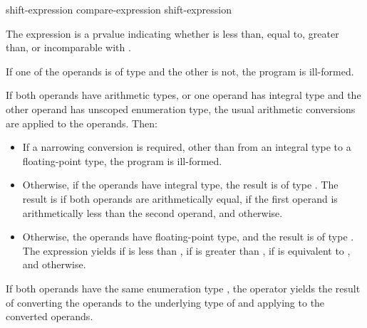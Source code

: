 %
%
%

\begin{bnf}
\br
    shift-expression\br
    compare-expression \terminal{<=>} shift-expression
\end{bnf}

\pnum
The expression  is a prvalue indicating whether
 is less than, equal to, greater than, or incomparable with
.

\pnum
If one of the operands is of type 
and the other is not, the program is ill-formed.

\pnum
If both operands have arithmetic types,
or one operand has integral type and
the other operand has unscoped enumeration type,
the usual arithmetic conversions are applied to the operands.
Then:

\begin{itemize}
\item
If a narrowing conversion is required,
other than from an integral type to a floating-point type,
the program is ill-formed.

\item
Otherwise, if the operands have integral type,
the result is of type .
The result is
if both operands are arithmetically equal,
if the first operand is arithmetically
less than the second operand,
and
otherwise.
\item
Otherwise, the operands have floating-point type, and
the result is of type .
The expression  yields
if  is less than ,
if  is greater than ,
if  is equivalent to ,
and
 otherwise.
\end{itemize}

\pnum
If both operands have the same enumeration type ,
the operator yields the result of
converting the operands to the underlying type of 
and applying \tcode{<=>} to the converted operands.

